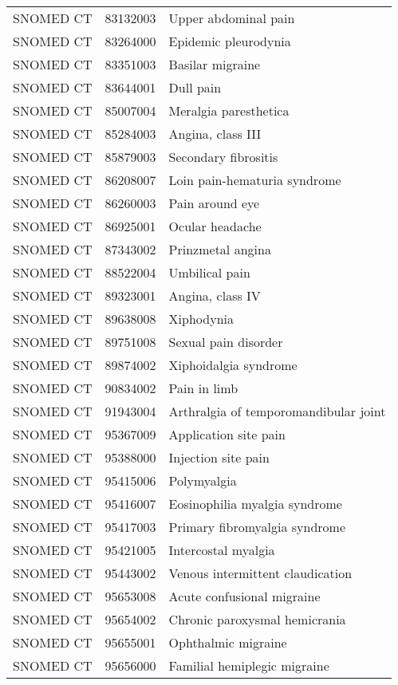 \begin{longtable}{p{}p{}p{}}
  SNOMED CT & 83132003 & Upper abdominal pain \\ 
  SNOMED CT & 83264000 & Epidemic pleurodynia \\ 
  SNOMED CT & 83351003 & Basilar migraine \\ 
  SNOMED CT & 83644001 & Dull pain \\ 
  SNOMED CT & 85007004 & Meralgia paresthetica \\ 
  SNOMED CT & 85284003 & Angina, class III \\ 
  SNOMED CT & 85879003 & Secondary fibrositis \\ 
  SNOMED CT & 86208007 & Loin pain-hematuria syndrome \\ 
  SNOMED CT & 86260003 & Pain around eye \\ 
  SNOMED CT & 86925001 & Ocular headache \\ 
  SNOMED CT & 87343002 & Prinzmetal angina \\ 
  SNOMED CT & 88522004 & Umbilical pain \\ 
  SNOMED CT & 89323001 & Angina, class IV \\ 
  SNOMED CT & 89638008 & Xiphodynia \\ 
  SNOMED CT & 89751008 & Sexual pain disorder \\ 
  SNOMED CT & 89874002 & Xiphoidalgia syndrome \\ 
  SNOMED CT & 90834002 & Pain in limb \\ 
  SNOMED CT & 91943004 & Arthralgia of temporomandibular joint \\ 
  SNOMED CT & 95367009 & Application site pain \\ 
  SNOMED CT & 95388000 & Injection site pain \\ 
  SNOMED CT & 95415006 & Polymyalgia \\ 
  SNOMED CT & 95416007 & Eosinophilia myalgia syndrome \\ 
  SNOMED CT & 95417003 & Primary fibromyalgia syndrome \\ 
  SNOMED CT & 95421005 & Intercostal myalgia \\ 
  SNOMED CT & 95443002 & Venous intermittent claudication \\ 
  SNOMED CT & 95653008 & Acute confusional migraine \\ 
  SNOMED CT & 95654002 & Chronic paroxysmal hemicrania \\ 
  SNOMED CT & 95655001 & Ophthalmic migraine \\ 
  SNOMED CT & 95656000 & Familial hemiplegic migraine \\ 

\end{longtable}
